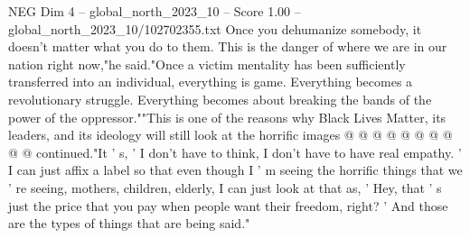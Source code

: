 \begin{textsample}{NEG Dim 4 – global\_north\_2023\_10 – Score 1.00 – global\_north\_2023\_10/102702355.txt}
Once you dehumanize somebody, it doesn't matter what you do to them.
This is the danger of where we are in our nation right now,"he said."Once a victim mentality has been sufficiently transferred into an individual, everything is game.
Everything becomes a revolutionary struggle.
Everything becomes about breaking the bands of the power of the oppressor.""This is one of the reasons why Black Lives Matter, its leaders, and its ideology will still look at the horrific images @ @ @ @ @ @ @ @ @ @ continued."It ' s, ' I don't have to think, I don't have to have real empathy. ' I can just affix a label so that even though I ' m seeing the horrific things that we ' re seeing, mothers, children, elderly, I can just look at that as, ' Hey, that ' s just the price that you pay when people want their freedom, right? ' And those are the types of things that are being said."

\end{textsample}
